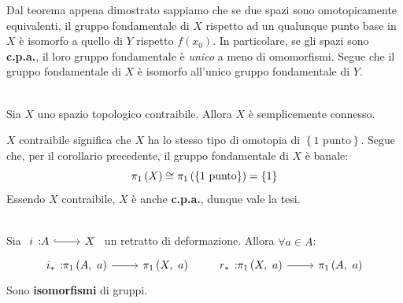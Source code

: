 \begin{demonstration}
	Dal teorema appena dimostrato sappiamo che se due spazi sono omotopicamente equivalenti, il gruppo fondamentale di $X$ rispetto ad un qualunque punto base in $X$ è isomorfo a quello di $Y$ rispetto $f\left(x_0\right)$. In particolare, se gli spazi sono \textbf{c.p.a.}, il loro gruppo fondamentale è \textit{unico} a meno di omomorfismi. Segue che il gruppo fondamentale di $X$ è isomorfo all'unico gruppo fondamentale di $Y$.
\end{demonstration}
\begin{corollary}~{}\\
	Sia $X$ uno spazio topologico contraibile. Allora $X$ è semplicemente connesso.
\end{corollary}
\begin{demonstration}
	$X$ contraibile significa che $X$ ha lo stesso tipo di omotopia di $\left\{1\text{ punto}\right\}$. Segue che, per il corollario precedente, il gruppo fondamentale di $X$ è banale:
	\begin{equation*}
		\gruf{X}{\ }\cong\gruf{\left\{1\text{ punto}\right\}}{\ }=\left\{1\right\}
	\end{equation*}
	Essendo $X$ contraibile, $X$ è anche \textbf{c.p.a.}, dunque vale la tesi.
\end{demonstration}
\begin{corollary}~{}\label{inclusione rdd isomorfismo}\\
Sia $\incl{i}{A}{X}$ un retratto di deformazione. Allora $\forall a\in A$:
\begin{equation}
	\funz{i_{\ast}}{\gruf{A}{a}}{\gruf{X}{a}}\qquad\funz{r_{\ast}}{\gruf{X}{a}}{\gruf{A}{a}}
\end{equation}
Sono \textbf{isomorfismi} di gruppi.
\end{corollary}
